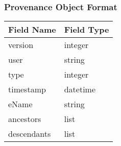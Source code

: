 \subsubsection{Provenance Object Format}
\label{POF}
\begin{table}[H]
\begin{tabular}{|l|l|}
\hline
Field Name & Field Type\\
\hline
version & integer\\
user & string\\
type & integer\\
timestamp & datetime\\
eName & string\\
ancestors & list\\
descendants & list \\
\hline
\end{tabular}
\end{table}
